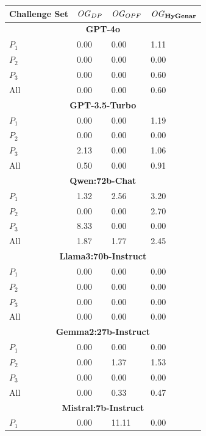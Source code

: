 \begin{table}
\centering
\begin{tabularx}{\textwidth}{l X X X}
\toprule
\textbf{Challenge Set} & \textbf{$\mathit{OG}_{DP}$} & \textbf{$\mathit{OG}_{OPF}$} & \textbf{$\mathit{OG}_{\textbf{HyGenar}}$} \\
\midrule
\multicolumn{4}{c}{\small\textbf{GPT-4o}} \\
\midrule
$P_1$ 
& 0.00 
& 0.00 
& 1.11 \\
$P_2$ 
& 0.00 
& 0.00 
& 0.00 \\
$P_3$ 
& 0.00 
& 0.00
& 0.60\\
All 
& 0.00
& 0.00 
& 0.60\\
\midrule
\multicolumn{4}{c}{\small\textbf{GPT-3.5-Turbo}} \\
\midrule
$P_1$ 
& 0.00
& 0.00
& 1.19\\
$P_2$ 
& 0.00 
& 0.00 
& 0.00\\
$P_3$ 
& 2.13 
& 0.00 
& 1.06\\
All 
& 0.50 
& 0.00 
& 0.91\\
\midrule
\multicolumn{4}{c}{\small\textbf{Qwen:72b-Chat}} \\
\midrule
$P_1$ 
& 1.32 
& 2.56
& 3.20\\
$P_2$ 
& 0.00 
& 0.00 
& 2.70 \\
$P_3$ 
& 8.33
& 0.00
& 0.00\\
All 
& 1.87 
& 1.77
& 2.45\\
\midrule
\multicolumn{4}{c}{\small\textbf{Llama3:70b-Instruct}} \\
\midrule
$P_1$ 
& 0.00 
& 0.00
& 0.00\\
$P_2$ 
& 0.00 
& 0.00
& 0.00\\
$P_3$ 
& 0.00 
& 0.00
& 0.00\\
All 
& 0.00 
& 0.00
& 0.00\\
\midrule
\multicolumn{4}{c}{\small\textbf{Gemma2:27b-Instruct}} \\
\midrule
$P_1$ 
& 0.00 
& 0.00
& 0.00\\
$P_2$ 
& 0.00 
& 1.37 
& 1.53\\
$P_3$ 
& 0.00 
& 0.00 
& 0.00\\
All 
& 0.00
& 0.33
& 0.47\\
\midrule
\multicolumn{4}{c}{\small\textbf{Mistral:7b-Instruct}} \\
\midrule
$P_1$ 
& 0.00 
& 11.11
& 0.00\\

\end{tabularx}
\end{table}
